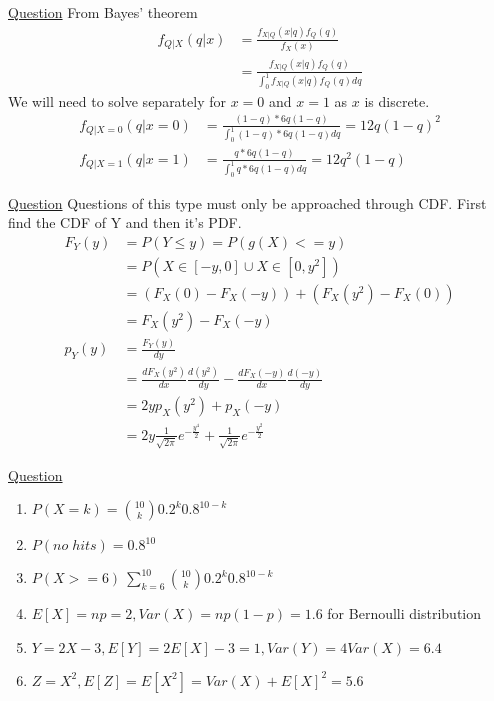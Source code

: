 \documentclass[../probability-notes.tex]{subfiles}
\begin{document}
\begin{enumerate}
        \hypertarget{a_bayes}{\item} \hyperlink{q_bayes}{Question}\newline
        From Bayes' theorem 
        \begin{align*}
            f_{Q|X}(q|x) &= \frac{f_{X|Q}(x|q) f_{Q}(q)}{f_{X}(x)}\\
                        &= \frac{f_{X|Q}(x|q) f_{Q}(q)}{\int_{0}^{1} f_{X|Q}(x|q) f_{Q}(q) dq}
        \end{align*}
        We will need to solve separately for $x = 0$ and $x = 1$ as $x$ is discrete.
        \begin{align*}
            f_{Q|X=0}(q|x=0) &= \frac{(1-q)* 6q(1-q)}{\int_{0}^{1} (1-q)*6q(1-q) dq} = 12q(1-q)^{2}\\
            f_{Q|X=1}(q|x=1) &= \frac{q* 6q(1-q)}{\int_{0}^{1} q*6q(1-q) dq} = 12q^{2}(1-q)
        \end{align*}
        
        \hypertarget{a_normaltr}{\item} \hyperlink{q_normaltr}{Question}\newline
        Questions of this type must only be approached through CDF. First find the CDF of Y and then it's PDF.
        \begin{align*}
            F_{Y}(y) &= P(Y \leq y) = P(g(X) <= y)\\
                    &= P(X \in [-y, 0] \cup X \in [0, y^{2}])\\
                    &= (F_{X}(0) - F_{X}(-y)) + (F_{X}(y^{2}) - F_{X}(0))\\
                    &= F_{X}(y^{2}) - F_{X}(-y)\\
            p_{Y}(y) &= \frac{F_{Y}(y)}{dy}\\
                    &= \frac{dF_{X}(y^{2})}{dx} \frac{d(y^{2})}{dy} - \frac{dF_{X}(-y)}{dx} \frac{d(-y)}{dy}\\
                    &= 2yp_{X}(y^{2}) + p_{X}(-y)\\
                    &= 2y\frac{1}{\sqrt{2\pi}}e^{-\frac{y^{4}}{2}} + \frac{1}{\sqrt{2\pi}} e^{-\frac{y^{2}}{2}}
        \end{align*}
        
        \hypertarget{a_binshoot}{\item} \hyperlink{q_binshoot}{Question}
        \begin{enumerate}
            \item $P(X=k) = \binom{10}{k} 0.2^{k}0.8^{10-k}$
            \item $P(no\;hits) = 0.8^{10}$
            \item $P(X>=6) \ \sum_{k=6}^{10} \binom{10}{k} 0.2^{k}0.8^{10-k}$
            \item $E[X] = np = 2, Var(X) = np(1-p) = 1.6$ for Bernoulli distribution
            \item $Y = 2X - 3, E[Y] = 2E[X] - 3 = 1, Var(Y) = 4Var(X) = 6.4$
            \item $Z = X^{2}, E[Z] = E[X^{2}] = Var(X) + E[X]^{2} = 5.6$
        \end{enumerate}


\end{enumerate}
\end{document}

